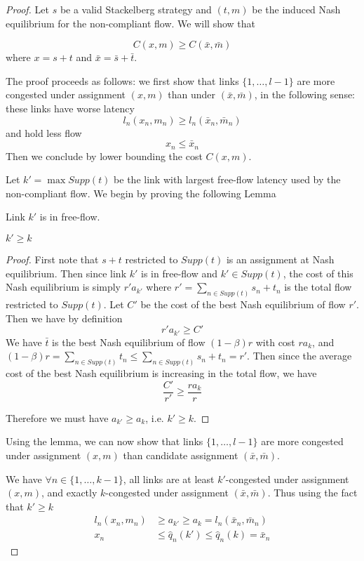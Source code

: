 \begin{proof}
Let $s$ be a valid Stackelberg strategy and $(t, m)$ be the induced Nash equilibrium for the non-compliant flow. We will show that

\[
C(x, m) \geq C(\bar{x}, \bar{m})
\]
where $x = s+t$ and $\bar{x} = \bar{s} + \bar{t}$.

\noindent The proof proceeds as follows: we first show that links $\{1, \dots, l-1\}$ are more congested under assignment $(x, m)$ than under $(\bar{x}, \bar{m})$, in the following sense: these links have worse latency
\[
l_n(x_n, m_n) \geq l_n(\bar{x}_n, \bar{m}_n)
\]
and hold less flow
\[
x_n \leq \bar{x}_n
\]
Then we conclude by lower bounding the cost $C(x, m)$.

\bigskip

Let $k' = \max Supp(t)$ be the link with largest free-flow latency used by the non-compliant flow. We begin by proving the following Lemma

\begin{lemma}
Link $k'$ is in free-flow.
\end{lemma}



\begin{lemma}
$k' \geq k$
\end{lemma}

\begin{proof}
First note that $s+t$ restricted to $Supp(t)$ is an assignment at Nash equilibrium. Then since link $k'$ is in free-flow and $k' \in Supp(t)$, the cost of this Nash equilibrium is simply $r'a_{k'}$ where $r' = \sum_{n\in Supp(t)} s_n + t_n$ is the total flow restricted to $Supp(t)$.
Let $C'$ be the cost of the best Nash equilibrium of flow $r'$. Then we have by definition
\[
r'a_{k'} \geq C'
\]
We have $\bar{t}$ is the best Nash equilibrium of flow $(1-\beta)r$ with cost $r a_k$, and $(1 - \beta)r = \sum_{n\in Supp(t)} t_n \leq \sum_{n\in Supp(t)} s_n + t_n = r'$. Then since the average cost of the best Nash equilibrium is increasing in the total flow, we have
\[
\frac{C'}{r'} \geq \frac{r a_k}{r}
\]

Therefore we must have $a_{k'} \geq a_k$, i.e. $k' \geq k$.
\end{proof}


\bigskip
Using the lemma, we can now show that links $\{1, \dots, l-1\}$ are more congested under assignment $(x, m)$ than candidate assignment $(\bar{x}, \bar{m})$.

We have $\forall n \in \{1, \dots, k-1\}$, all links are at least $k'$-congested under assignment $(x, m)$, and exactly $k$-congested under assignment $(\bar{x}, \bar{m})$. Thus using the fact that $k' \geq k$
\begin{align*}
l_n(x_n, m_n) &\geq a_{k'} \geq a_k = l_n(\bar{x}_n, \bar{m}_n)\\
x_n &\leq \hat{q}_n(k') \leq \hat{q}_n(k) = \bar{x}_n
\end{align*}


\end{proof}
